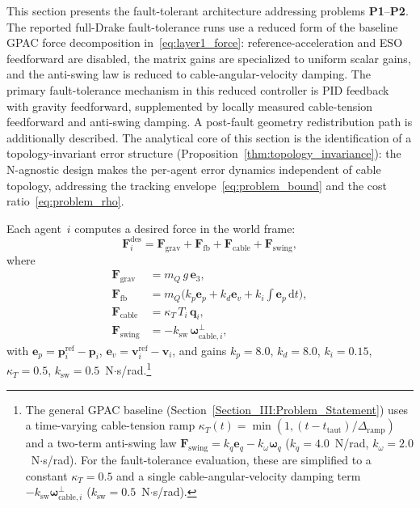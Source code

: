 This section presents the fault-tolerant architecture addressing problems \textbf{P1}--\textbf{P2}. The reported full-Drake fault-tolerance runs use a reduced form of the baseline GPAC force decomposition in~\eqref{eq:layer1_force}: reference-acceleration and ESO feedforward are disabled, the matrix gains are specialized to uniform scalar gains, and the anti-swing law is reduced to cable-angular-velocity damping. The primary fault-tolerance mechanism in this reduced controller is PID feedback with gravity feedforward, supplemented by locally measured cable-tension feedforward and anti-swing damping. A post-fault geometry redistribution path is additionally described. The analytical core of this section is the identification of a topology-invariant error structure (Proposition~\ref{thm:topology_invariance}): the N-agnostic design makes the per-agent error dynamics independent of cable topology, addressing the tracking envelope~\eqref{eq:problem_bound} and the cost ratio~\eqref{eq:problem_rho}.

Each agent~$i$ computes a desired force in the world frame:
\begin{equation}\label{eq:layer1_force_ft}
  \bm{F}_i^{\mathrm{des}} = \bm{F}_{\mathrm{grav}} + \bm{F}_{\mathrm{fb}} + \bm{F}_{\mathrm{cable}} + \bm{F}_{\mathrm{swing}},
\end{equation}
where
\begin{align}
  \bm{F}_{\mathrm{grav}} &= m_Q\, g\, \bm{e}_3, \label{eq:grav_ff} \\
  \bm{F}_{\mathrm{fb}} &= m_Q\bigl(k_p \bm{e}_p + k_d \bm{e}_v + k_i \textstyle\int \bm{e}_p\,\mathrm{d}t\bigr), \label{eq:pid_fb} \\
  \bm{F}_{\mathrm{cable}} &= \kappa_T\, T_i\, \bm{q}_i, \label{eq:cable_ff} \\
  \bm{F}_{\mathrm{swing}} &= -k_{\mathrm{sw}}\, \bm{\omega}_{\mathrm{cable},i}^{\perp}, \label{eq:antiswing}
\end{align}
with $\bm{e}_p = \bm{p}_i^{\mathrm{ref}} - \bm{p}_i$, $\bm{e}_v = \bm{v}_i^{\mathrm{ref}} - \bm{v}_i$, and gains $k_p = 8.0$, $k_d = 8.0$, $k_i = 0.15$, $\kappa_T = 0.5$, $k_{\mathrm{sw}} = 0.5$~N$\cdot$s/rad.\footnote{The general GPAC baseline (Section~\ref{Section_III:Problem_Statement}) uses a time-varying cable-tension ramp $\kappa_T(t) = \min(1, (t - t_{\mathrm{taut}})/\Delta_{\mathrm{ramp}})$ and a two-term anti-swing law $\bm{F}_{\mathrm{swing}} = k_q \bm{e}_q - k_\omega \bm{\omega}_q$ ($k_q = 4.0$~N/rad, $k_\omega = 2.0$~N$\cdot$s/rad). For the fault-tolerance evaluation, these are simplified to a constant $\kappa_T = 0.5$ and a single cable-angular-velocity damping term $-k_{\mathrm{sw}} \bm{\omega}_{\mathrm{cable},i}^{\perp}$ ($k_{\mathrm{sw}} = 0.5$~N$\cdot$s/rad).}

